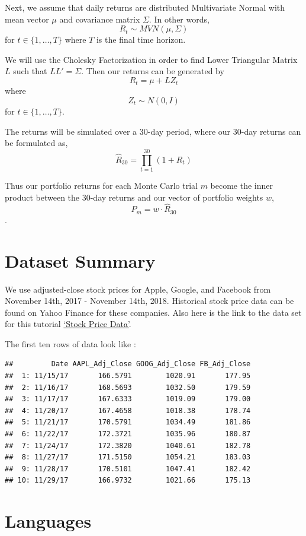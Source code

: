 \documentclass[]{book}
\begin{document}
Next, we assume that daily returns are distributed Multivariate Normal with mean
vector \(\mu\) and covariance matrix \(\Sigma\). In other words,
\[R_t \sim MVN(\mu, \Sigma)\] for \(t \in \{1,\dots,T\}\) where \(T\) is the final
time horizon.

We will use the Cholesky Factorization in order to find Lower Triangular Matrix
\(L\) such that \(LL' = \Sigma\). Then our returns can be generated by
\[ R_t = \mu + LZ_t \] where \[Z_t \sim N(0,I)\] for \(t \in \{1,\dots,T\}\).

The returns will be simulated over a 30-day period, where our 30-day returns
can be formulated as, \[\hat R_{30} = \prod_{t=1}^{30} (1+R_t)\]

Thus our portfolio returns for each Monte Carlo trial \(m\) become the inner
product between the 30-day returns and our vector of portfolio weights \(w\),
\[P_m = w \cdot \hat R_{30} \].

\hypertarget{dataset-summary}{%
\section{Dataset Summary}\label{dataset-summary}}

We use adjusted-close stock prices for Apple, Google, and Facebook from November 14th, 2017 - November 14th, 2018. Historical stock price data can be found on Yahoo
Finance for these companies. Also here is the link to the data set for this
tutorial \href{https://raw.githubusercontent.com/ShuoranLi/506_Project/master/Group21_ProjectData.csv}{`Stock Price Data'}.

The first ten rows of data look like :

\begin{verbatim}
##         Date AAPL_Adj_Close GOOG_Adj_Close FB_Adj_Close
##  1: 11/15/17       166.5791        1020.91       177.95
##  2: 11/16/17       168.5693        1032.50       179.59
##  3: 11/17/17       167.6333        1019.09       179.00
##  4: 11/20/17       167.4658        1018.38       178.74
##  5: 11/21/17       170.5791        1034.49       181.86
##  6: 11/22/17       172.3721        1035.96       180.87
##  7: 11/24/17       172.3820        1040.61       182.78
##  8: 11/27/17       171.5150        1054.21       183.03
##  9: 11/28/17       170.5101        1047.41       182.42
## 10: 11/29/17       166.9732        1021.66       175.13
\end{verbatim}

\hypertarget{languages}{%
\section{Languages}\label{languages}}
\end{document}
